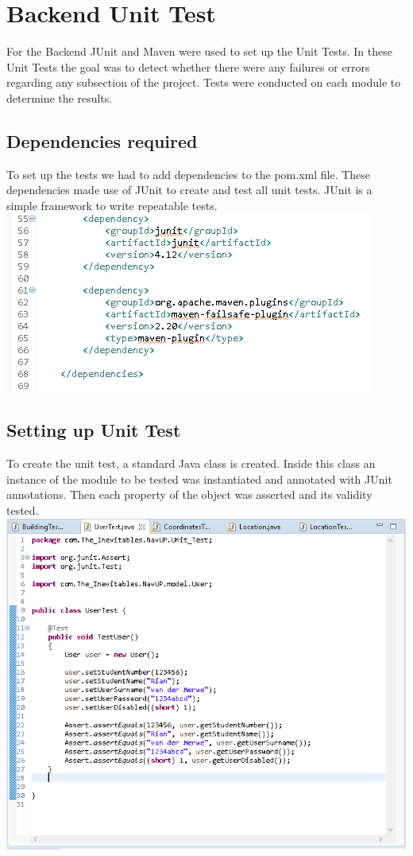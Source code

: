 \section{Backend Unit Test}
For the Backend JUnit and Maven were used to set up the Unit Tests. In these Unit Tests the goal was to detect whether there were any failures or errors regarding any subsection of the project.
Tests were conducted on each module to determine the results.

\subsection{Dependencies required}
To set up the tests we had to add dependencies to the pom.xml file. These dependencies made use of JUnit to create and test all unit tests.
JUnit is a simple framework to write repeatable tests.
\includegraphics[]{backend/data/Dependencies_needed.png}

\subsection{Setting up Unit Test}
To create the unit test, a standard Java class is created. Inside this class an instance of the module to be tested was instantiated and annotated with JUnit annotations.
Then each property of the object was asserted and its validity tested.
\includegraphics[]{backend/data/User_Unit_Test.png}

